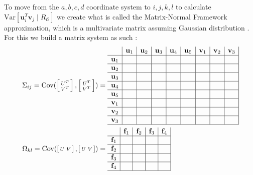 To move from the $a,b,c,d$ coordinate system to $i,j,k,l$ to calculate $\mathrm{Var}[\mathbf{u}_i^T \mathbf{v}_j \mid R_\mathcal{O}]$ we create what is called the Matrix-Normal Framework approximation, which is a multivariate matrix assuming Gaussian distribution \cite{gupta1999matrix}.  For this we build a matrix system as such \cite{active-mf-slides}:
\begin{align}
\Sigma_{ij} = \mathrm{Cov}(\left[\begin{smallmatrix} U^T\\ V^T \end{smallmatrix}\right], \left[\begin{smallmatrix} U^T\\ V^T \end{smallmatrix}\right]) &=  
\begin{array}{c|c|c|c|c|c|c|c|c|}
  & \mathbf{u}_1 & \mathbf{u}_2 & \mathbf{u}_3 & \mathbf{u}_4 & \mathbf{u}_5 & \mathbf{v}_1 & \mathbf{v}_2 & \mathbf{v}_3 \\ \hline
\mathbf{u}_1  &  &   &   &   &   &  &  &  \\ \hline
\mathbf{u}_2 &  &   &   &   &   &  &  &  \\ \hline
\mathbf{u}_3  &  &   &   &   &   &  &  &  \\ \hline
\mathbf{u}_4  &  &   &   &   &   &  &  &  \\ \hline
\mathbf{u}_5  &  &   &   &   &   &  &  &  \\ \hline
\mathbf{v}_1  &  &   &   &   &   &  &  &  \\ \hline
\mathbf{v}_2  &  &   &   &   &   &  &  &  \\ \hline
\mathbf{v}_3  &  &   &   &   &   &  &  &  \\ \hline
\end{array} \label{eq:sigma_cov} \\
\Omega_{kl} =  \mathrm{Cov}(\left[\begin{smallmatrix} U & V \end{smallmatrix}\right], \left[\begin{smallmatrix} U & V \end{smallmatrix}\right]) &= 
\begin{array}{c|c|c|c|c|}
  & \mathbf{f}_1 & \mathbf{f}_2 & \mathbf{f}_3 & \mathbf{f}_4  \\ \hline
\mathbf{f}_1  &  &   &   &    \\ \hline
\mathbf{f}_2 &  &   &   &     \\ \hline
\mathbf{f}_3  &  &   &   &    \\ \hline
\mathbf{f}_4  &  &   &   &    \\ \hline
\end{array} \label{eq:omega_cov}
\end{align}

